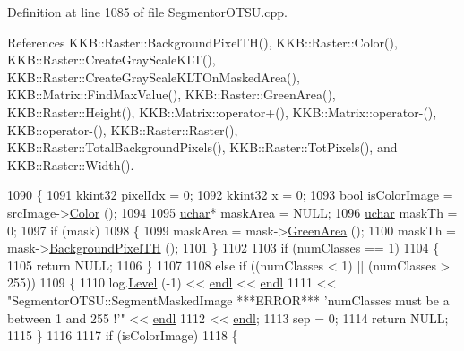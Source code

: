 Definition at line 1085 of file Segmentor\+O\+T\+S\+U.\+cpp.



References K\+K\+B\+::\+Raster\+::\+Background\+Pixel\+T\+H(), K\+K\+B\+::\+Raster\+::\+Color(), K\+K\+B\+::\+Raster\+::\+Create\+Gray\+Scale\+K\+L\+T(), K\+K\+B\+::\+Raster\+::\+Create\+Gray\+Scale\+K\+L\+T\+On\+Masked\+Area(), K\+K\+B\+::\+Matrix\+::\+Find\+Max\+Value(), K\+K\+B\+::\+Raster\+::\+Green\+Area(), K\+K\+B\+::\+Raster\+::\+Height(), K\+K\+B\+::\+Matrix\+::operator+(), K\+K\+B\+::\+Matrix\+::operator-\/(), K\+K\+B\+::operator-\/(), K\+K\+B\+::\+Raster\+::\+Raster(), K\+K\+B\+::\+Raster\+::\+Total\+Background\+Pixels(), K\+K\+B\+::\+Raster\+::\+Tot\+Pixels(), and K\+K\+B\+::\+Raster\+::\+Width().


\begin{DoxyCode}
1090 \{
1091   \hyperlink{namespace_k_k_b_a8fa4952cc84fda1de4bec1fbdd8d5b1b}{kkint32}  pixelIdx = 0;
1092   \hyperlink{namespace_k_k_b_a8fa4952cc84fda1de4bec1fbdd8d5b1b}{kkint32}  x        = 0;
1093   \textcolor{keywordtype}{bool}  isColorImage = srcImage->\hyperlink{class_k_k_b_1_1_raster_a644248f99009d64ac4b8fef4a22aff25}{Color} ();
1094 
1095   \hyperlink{namespace_k_k_b_ace9969169bf514f9ee6185186949cdf7}{uchar}*  maskArea = NULL;
1096   \hyperlink{namespace_k_k_b_ace9969169bf514f9ee6185186949cdf7}{uchar}   maskTh   = 0;
1097   \textcolor{keywordflow}{if}  (mask)
1098   \{
1099     maskArea = mask->\hyperlink{class_k_k_b_1_1_raster_af6ceacfa7835a295d239d141627dbec7}{GreenArea} ();
1100     maskTh   = mask->\hyperlink{class_k_k_b_1_1_raster_a96e0ed160e633c316cf83890ef3438eb}{BackgroundPixelTH} ();
1101   \}
1102 
1103   \textcolor{keywordflow}{if}  (numClasses == 1)
1104   \{
1105     \textcolor{keywordflow}{return}  NULL;
1106   \}
1107 
1108   \textcolor{keywordflow}{else} \textcolor{keywordflow}{if}  ((numClasses < 1)  ||  (numClasses > 255))
1109   \{
1110     log.\hyperlink{class_k_k_b_1_1_run_log_a32cf761d7f2e747465fd80533fdbb659}{Level} (-1) << \hyperlink{namespace_k_k_b_ad1f50f65af6adc8fa9e6f62d007818a8}{endl} << \hyperlink{namespace_k_k_b_ad1f50f65af6adc8fa9e6f62d007818a8}{endl}
1111       << \textcolor{stringliteral}{"SegmentorOTSU::SegmentMaskedImage  ***ERROR***   'numClasses must be a between 1 and 255 !'"} << 
      \hyperlink{namespace_k_k_b_ad1f50f65af6adc8fa9e6f62d007818a8}{endl}
1112       << \hyperlink{namespace_k_k_b_ad1f50f65af6adc8fa9e6f62d007818a8}{endl};
1113     sep = 0;
1114     \textcolor{keywordflow}{return} NULL;
1115   \}
1116 
1117   \textcolor{keywordflow}{if}  (isColorImage)
1118   \{

\end{DoxyCode}
